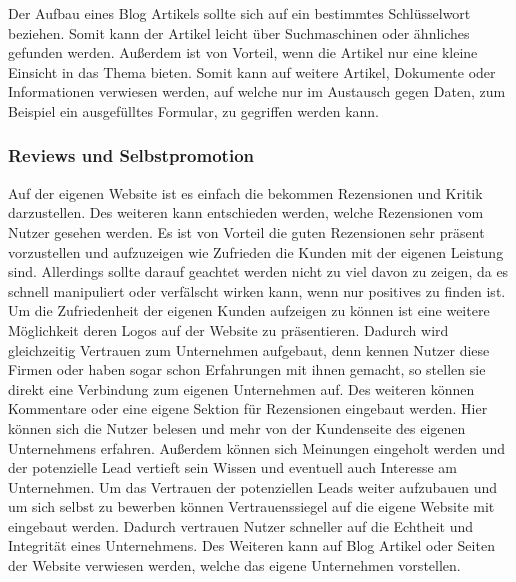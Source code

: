 \newline
Der Aufbau eines Blog Artikels sollte sich auf ein bestimmtes Schlüsselwort beziehen. Somit kann der Artikel leicht über Suchmaschinen oder ähnliches gefunden werden. Außerdem ist von Vorteil, wenn die Artikel nur eine kleine Einsicht in das Thema bieten. Somit kann auf weitere Artikel, Dokumente oder Informationen verwiesen werden, auf welche nur im Austausch gegen Daten, zum Beispiel ein ausgefülltes Formular, zu gegriffen werden kann. 

\subsubsection{Reviews und Selbstpromotion}
Auf der eigenen Website ist es einfach die bekommen Rezensionen und Kritik darzustellen. Des weiteren kann entschieden werden, welche Rezensionen vom Nutzer gesehen werden. Es ist von Vorteil die guten Rezensionen sehr präsent vorzustellen und aufzuzeigen wie Zufrieden die Kunden mit der eigenen Leistung sind. Allerdings sollte darauf geachtet werden nicht zu viel davon zu zeigen, da es schnell manipuliert oder verfälscht wirken kann, wenn nur positives zu finden ist. 
\newline
Um die Zufriedenheit der eigenen Kunden aufzeigen zu können ist eine weitere Möglichkeit deren Logos auf der Website zu präsentieren. Dadurch wird gleichzeitig Vertrauen zum Unternehmen aufgebaut, denn kennen Nutzer diese Firmen oder haben sogar schon Erfahrungen mit ihnen gemacht, so stellen sie direkt eine Verbindung zum eigenen Unternehmen auf. Des weiteren können Kommentare oder eine eigene Sektion für Rezensionen eingebaut werden. Hier können sich die Nutzer belesen und mehr von der Kundenseite des eigenen Unternehmens erfahren. Außerdem können sich Meinungen eingeholt werden und der potenzielle Lead vertieft sein Wissen und eventuell auch Interesse am Unternehmen.
\newline
Um das Vertrauen der potenziellen Leads weiter aufzubauen und um sich selbst zu bewerben können Vertrauenssiegel auf die eigene Website mit eingebaut werden. Dadurch vertrauen Nutzer schneller auf die Echtheit und Integrität eines Unternehmens. Des Weiteren kann auf Blog Artikel oder Seiten der Website verwiesen werden, welche das eigene Unternehmen vorstellen. 


